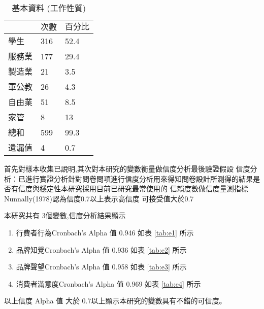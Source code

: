 \begin{table}[htb]
\caption{基本資料 (工作性質)}
\label{tab:PL4}
\renewcommand{\arraystretch}{1.2} %
\arrayrulewidth=1pt               %
\tabcolsep=60pt                   %
\begin{tabular}[t]{lll}  %
\hline
 & $次數$ & $百分比$ \\
\hline
學生           & 316  & 52.4 \\
服務業        & 177  & 29.4 \\
製造業        & 21  & 3.5 \\
軍公教        & 26  &4.3\\
自由業        & 51  & 8.5 \\
家管           & 8  & 13 \\
總和               & 599  & 99.3 \\
遺漏值            & 4 & 0.7 \\
\hline
\end{tabular}
\end{table}

首先對樣本收集已說明,其次對本研究的變數衡量做信度分析最後驗證假設
信度分析：已進行實證分析針對問卷問項進行信度分析用來得知問卷設計所測得的結果是否有信度與穩定性本研究採用目前已研究最常使用的 信賴度數做信度量測指標 Nunnally(1978)認為信度0.7以上表示高信度 可接受值大於0.7

本研究共有 3個變數,信度分析結果顯示
\begin{enumerate}
\item 行費者行為Cronbach's Alpha 值 0.946  如表 \ref{tab:e1}  所示
\item 品牌知覺Cronbach's Alpha 值 0.936  如表 \ref{tab:e2}  所示
\item 品牌聲望Cronbach's Alpha 值  0.958 如表 \ref{tab:e3}  所示
\item 消費者滿意度Cronbach's Alpha 值 0.969 如表 \ref{tab:e4}  所示
\end{enumerate}
以上信度 Alpha 值 大於 0.7以上顯示本研究的變數具有不錯的可信度。

